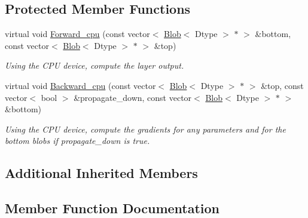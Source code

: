 \subsection*{Protected Member Functions}
\begin{DoxyCompactItemize}
\item 
virtual void \hyperlink{classcaffe_1_1PythonLayer_ad1ec98336aab5e8082721973d59974d4}{Forward\+\_\+cpu} (const vector$<$ \hyperlink{classcaffe_1_1Blob}{Blob}$<$ Dtype $>$ $\ast$ $>$ \&bottom, const vector$<$ \hyperlink{classcaffe_1_1Blob}{Blob}$<$ Dtype $>$ $\ast$ $>$ \&top)\hypertarget{classcaffe_1_1PythonLayer_ad1ec98336aab5e8082721973d59974d4}{}\label{classcaffe_1_1PythonLayer_ad1ec98336aab5e8082721973d59974d4}

\begin{DoxyCompactList}\small\item\em Using the C\+PU device, compute the layer output. \end{DoxyCompactList}\item 
virtual void \hyperlink{classcaffe_1_1PythonLayer_ac2daa2441975b3a6db13a57082559800}{Backward\+\_\+cpu} (const vector$<$ \hyperlink{classcaffe_1_1Blob}{Blob}$<$ Dtype $>$ $\ast$ $>$ \&top, const vector$<$ bool $>$ \&propagate\+\_\+down, const vector$<$ \hyperlink{classcaffe_1_1Blob}{Blob}$<$ Dtype $>$ $\ast$ $>$ \&bottom)\hypertarget{classcaffe_1_1PythonLayer_ac2daa2441975b3a6db13a57082559800}{}\label{classcaffe_1_1PythonLayer_ac2daa2441975b3a6db13a57082559800}

\begin{DoxyCompactList}\small\item\em Using the C\+PU device, compute the gradients for any parameters and for the bottom blobs if propagate\+\_\+down is true. \end{DoxyCompactList}\end{DoxyCompactItemize}
\subsection*{Additional Inherited Members}


\subsection{Member Function Documentation}
